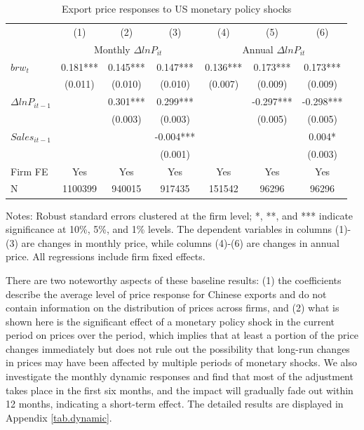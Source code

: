 \begin{table}[htbp]
    \centering
    \caption{Export price responses to US monetary policy shocks}
    \begin{threeparttable}
    \begin{tabular}{lcccccc}
        \toprule
        & (1)   & (2)   & (3)   & (4)   & (5)   & (6) \\
        & \multicolumn{3}{c}{Monthly $\Delta ln P_{it}$} & \multicolumn{3}{c}{Annual $\Delta ln P_{it}$}  \\
        \midrule
        $brw_t$   & 0.181*** & 0.145*** & 0.147*** & 0.136*** & 0.173*** & 0.173*** \\
              & (0.011) & (0.010) & (0.010) & (0.007) & (0.009) & (0.009) \\
        $\Delta ln P_{it-1}$ &       & 0.301*** & 0.299*** &       & -0.297*** & -0.298***  \\
              &       & (0.003) & (0.003) &       & (0.005) & (0.005) \\
        $Sales_{it-1}$ &       &       & -0.004*** &       &       &  0.004*\\
              &       &       & (0.001) &       &       &  (0.003)\\
        \midrule
        Firm FE & Yes   & Yes   & Yes   & Yes   & Yes   & Yes \\
        N     & 1100399 & 940015 & 917435 & 151542 & 96296 & 96296 \\
        \bottomrule
    \end{tabular}
        \begin{tablenotes}
            \footnotesize
            \item Notes: Robust standard errors clustered at the firm level;  *, **, and *** indicate significance at 10\%, 5\%, and 1\% levels. The dependent variables in columns (1)-(3) are changes in monthly price, while columns (4)-(6) are changes in annual price. All regressions include firm fixed effects.
	\end{tablenotes}
    \end{threeparttable}
    \label{tab.baseline}
\end{table}

There are two noteworthy aspects of these baseline results: (1) the coefficients describe the average level of price response for Chinese exports and do not contain information on the distribution of prices across firms, and (2) what is shown here is the significant effect of a monetary policy shock in the current period on prices over the period, which implies that at least a portion of the price changes immediately but does not rule out the possibility that long-run changes in prices may have been affected by multiple periods of monetary shocks. We also investigate the monthly dynamic responses and find that most of the adjustment takes place in the first six months, and the impact will gradually fade out within 12 months, indicating a short-term effect. The detailed results are displayed in Appendix \ref{tab.dynamic}.

